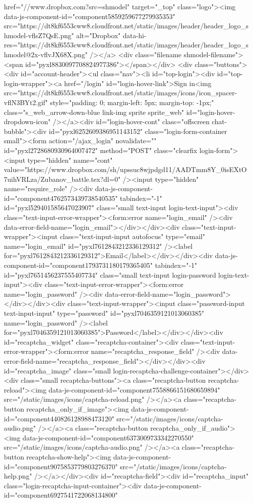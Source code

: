 {href="//www.dropbox.com?src=shmodel" target="_top" class="logo"><img data-js-component-id="component5859259677279935353" src="https://dt8kf6553cww8.cloudfront.net/static/images/header/header_logo_shmodel-vflsZ7QsE.png" alt="Dropbox" data-hi-res="https://dt8kf6553cww8.cloudfront.net/static/images/header/header_logo_shmodel@2x-vflvJX68X.png" /></a> <div class="filename shmodel-filename"><span id="pyxl8830097708824977386"></span></div> <div class="buttons"> <div id="account-header"><ul class="nav"><li id="top-login"><div id="top-login-wrapper"><a href="/login" id="login-hover-link">Sign in<img src="https://dt8kf6553cww8.cloudfront.net/static/images/icons/icon_spacer-vflN3BYt2.gif" style="padding: 0; margin-left: 5px; margin-top: -1px;" class="s_web_arrow-down-blue link-img sprite sprite_web" id="login-hover-dropdown-icon" /></a><div id="login-hover-cont" class="offscreen chat-bubble"><div id="pyxl6252609386951143152" class="login-form-container  small"><form action="/ajax_login" novalidate="" id="pyxl2728680930964007472" method="POST" class="clearfix login-form"><input type="hidden" name="cont" value="https://www.dropbox.com/sh/upssuc8wjpdgd11/AADTmm8Y_0isEXtO7uihVRLza/Zubanov_battle.tex?dl=0" /><input type="hidden" name="require_role" /><div data-js-component-id="component4762573439738540535" tabindex="-1" id="pyxl529401585647023907" class="small text-input login-text-input"><div class="text-input-error-wrapper"><form:error name="login_email" /><div data-error-field-name="login_email"></div></div><div class="text-input-wrapper"><input class="text-input-input autofocus" type="email" name="login_email" id="pyxl7612843212336129312" /><label for="pyxl7612843212336129312">Email</label></div></div><div data-js-component-id="component1793731180179365405" tabindex="-1" id="pyxl7651456237555407734" class="small text-input login-password login-text-input"><div class="text-input-error-wrapper"><form:error name="login_password" /><div data-error-field-name="login_password"></div></div><div class="text-input-wrapper"><input class="password-input text-input-input" type="password" id="pyxl7046359121013060385" name="login_password" /><label for="pyxl7046359121013060385">Password</label></div></div><div id="recaptcha_widget" class="recaptcha-container"><div class="text-input-error-wrapper"><form:error name="recaptcha_response_field" /><div data-error-field-name="recaptcha_response_field"></div></div><div id="recaptcha_image" class="small login-recaptcha-challenge-container"></div><div class="small recaptcha-buttons"><a class="recaptcha-button recaptcha-reload"><img data-js-component-id="component7558866151680659894" src="/static/images/icons/captcha-reload.png" /></a><a class="recaptcha-button recaptcha_only_if_image"><img data-js-component-id="component440826128988473120" src="/static/images/icons/captcha-audio.png" /></a><a class="recaptcha-button recaptcha_only_if_audio"><img data-js-component-id="component6373009733342270550" src="/static/images/icons/captcha-audio.png" /></a><a class="recaptcha-button recaptcha-show-help"><img data-js-component-id="component9075853779803276370" src="/static/images/icons/captcha-help.png" /></a></div><div id="recaptcha-field"><div id="recaptcha_input" class="login-recaptcha-input-container"><div data-js-component-id="component6927541722068134800" }
